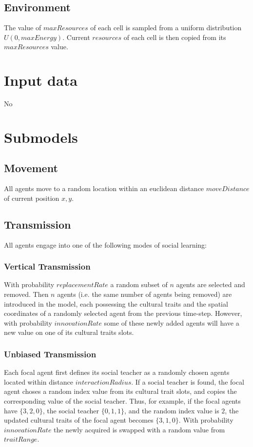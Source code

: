 \documentclass[11pt,a4paper,twocolumn,notitlepage]{article}
\begin{document}
\subsection{Environment}

The value of $maxResources$ of each cell is sampled from a uniform distribution $U(0,maxEnergy)$. Current $resources$ of each cell is then copied from its $maxResources$ value.

\section{Input data}

No

\section{Submodels}

\subsection{Movement}

All agents move to a random location within an euclidean distance $moveDistance$ of current position $x,y$.

\subsection{Transmission}
All agents engage into one of the following modes of social learning:

\subsubsection{Vertical Transmission}

With probability $replacementRate$ a random subset of $n$ agents are selected and removed. Then $n$ agents (i.e. the same number of agents being removed) are introduced in the model, each possessing the cultural traits and the spatial coordinates of a randomly selected agent from the previous time-step. However, with probability $innovationRate$ some of these newly added agents will have a new value on one of its cultural traits slots.

\subsubsection{Unbiased Transmission}

Each focal agent first defines its social teacher as a randomly chosen agents located within distance $interactionRadius$. If a social teacher is found, the focal agent choses a random index value from its cultural trait slots, and copies the corresponding value of the social teacher. Thus, for example, if the focal agents have $\{3,2,0\}$,  the social teacher $\{0,1,1\}$, and the random index value is $2$, the updated cultural traits of the focal agent becomes $\{3,1,0\}$. With probability $innovationRate$ the newly acquired is swapped with a random value from $traitRange$.
\end{document}
